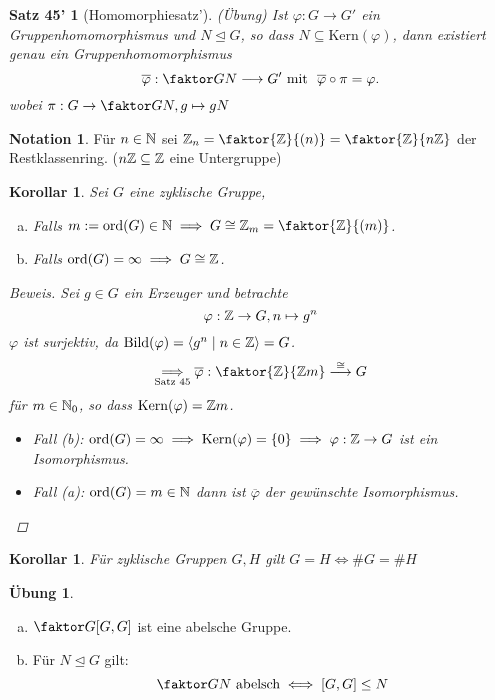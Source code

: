 \documentclass[a4paper]{report}
\theoremstyle{plain}
\newtheorem*{satz45'}{Satz 45'}
\newtheorem{kor}[thm]{Korollar}
\theoremstyle{definition}
\newtheorem*{nota*}{Notation}
\newtheorem*{ubng*}{Übung}
\begin{document}
\begin{satz45'}[Homomorphiesatz'](Übung)
  Ist $\varphi : G \to G'$ ein Gruppenhomomorphismus und $N \trianglelefteq G$, so dass $N \subseteq \mathrm{Kern}(\varphi)$, dann existiert genau ein Gruppenhomomorphismus $$\overline\varphi : \faktor GN \longrightarrow G'\text{ mit }\ \overline\varphi \circ \pi = \varphi.$$
  wobei $\pi : G \to \faktor GN, g \mapsto gN$
\end{satz45'}
\begin{nota*}
Für $n \in \Bbb N$ sei $\Bbb Z_{n} = \faktor {\Bbb Z}{(n)} = \faktor{\Bbb Z}{n\Bbb Z}$ der Restklassenring. ($n\Bbb Z \subseteq \Bbb Z $ eine Untergruppe)
\end{nota*}

\begin{kor}
  Sei $G$ eine zyklische Gruppe,
  \begin{enumerate}[(a)]
    \item Falls $m:= \mathrm{ord}(G) \in \Bbb N \implies G \cong \Bbb Z_{m} = \faktor{\Bbb Z}{(m)}$.
          \item Falls $\mathrm{ord}(G) = \infty \implies G \cong \Bbb Z$.
  \end{enumerate}
\begin{proof}[Beweis]
  Sei $g \in G$ ein Erzeuger und betrachte $$\varphi : \Bbb Z \to G, n \mapsto g^{n}$$
  $\varphi$ ist surjektiv, da $\mathrm{Bild}(\varphi) = \langle g^{n} \mid n \in \Bbb Z \rangle = G$.
  $$\underset{\text{Satz 45}}\implies \overline\varphi : \faktor{\Bbb Z}{\Bbb Zm} \overset \cong \longrightarrow{} G$$
  für $m \in \Bbb N_{0}$, so dass $\mathrm{Kern}(\varphi) = \Bbb Zm$.
  \begin{itemize}
\item Fall (b): $\mathrm{ord}(G) = \infty \implies \mathrm{Kern}(\varphi) = \{0\} \implies \varphi : \Bbb Z \to G$ ist ein Isomorphismus.
\item Fall (a): $\mathrm{ord}(G) = m \in \Bbb N$ dann ist $\overline\varphi$ der gewünschte Isomorphismus.
 \end{itemize}
\end{proof}
\end{kor}
\begin{kor}Für zyklische Gruppen $G, H$ gilt $G = H \iff \#G = \#H$
\end{kor}
\begin{ubng*}
\begin{enumerate}[(a)]
  \item $\faktor G{[G, G]}$ ist eine abelsche Gruppe.
  \item Für $N \trianglelefteq G$ gilt:
        $$\faktor GN \text{ abelsch} \iff [G, G] \le N$$
\end{enumerate}
\end{ubng*}
\end{document}
